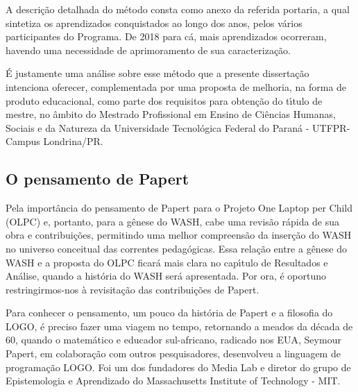 \documentclass[
12pt,		%
openright,	%
twoside,  %
a4paper,			%
chapter=TITLE,		%
english,			%
french,				%
spanish,			%
brazil				%
]{USPSC-classe/USPSC}
\begin{document}
A descri\c{c}\~ao detalhada do m\'etodo consta como anexo da referida portaria, a qual sintetiza os aprendizados conquistados ao longo dos anos, pelos v\'arios participantes do Programa. De 2018 para c\'a, mais aprendizados ocorreram, havendo uma necessidade de aprimoramento de sua caracteriza\c{c}\~ao.








\'E justamente uma an\'alise sobre esse m\'etodo que a presente disserta\c{c}\~ao intenciona oferecer, complementada por uma proposta de melhoria, na forma de produto educacional, como parte dos requisitos para obten\c{c}\~ao do t\'{\i}tulo de mestre, no \^ambito do Mestrado Profissional em Ensino de Ci\^encias Humanas, Sociais e da Natureza da Universidade  Tecnol\'ogica Federal do Paran\'a - UTFPR- Campus Londrina/PR.








\subsection[O pensamento de Papert]{O pensamento de Papert}\label{O pensamento de Papert}
Pela import\^ancia do pensamento de Papert para o Projeto One Laptop per Child (OLPC) e, portanto, para a g\^enese do WASH, cabe uma revis\~ao r\'apida de sua obra e contribui\c{c}\~oes, permitindo uma melhor compreens\~ao da inser\c{c}\~ao do WASH no universo conceitual das correntes pedag\'ogicas. Essa rela\c{c}\~ao entre a g\^enese do WASH e a proposta do OLPC ficar\'a mais clara no cap\'{\i}tulo de Resultados e An\'alise, quando a hist\'oria do WASH ser\'a apresentada. Por ora, \'e oportuno restringirmos-nos \`a revisita\c{c}\~ao das contribui\c{c}\~oes de Papert.








Para conhecer  o pensamento, um pouco da hist\'oria de Papert e  a filosofia do LOGO, \'e preciso fazer uma viagem no tempo, retornando a meados da d\'ecada de 60, quando o matem\'atico e educador sul-africano, radicado nos EUA, Seymour Papert, em colabora\c{c}\~ao com outros pesquisadores, desenvolveu a linguagem  de programa\c{c}\~ao LOGO.  Foi um dos fundadores do Media Lab e diretor do grupo de Epistemologia e Aprendizado do Massachusetts Institute of Technology - MIT.
\end{document}

